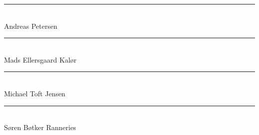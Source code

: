 \thispagestyle{empty}
\vspace*{\fill}
\noindent
\sffamily
%
\rule{9cm}{1pt}\\
\vspace{1.5cm}
Andreas Petersen\\
%
\rule{9cm}{1pt}\\
\vspace{1.5cm}
Mads Ellersgaard Kalør\\
%
\rule{9cm}{1pt}\\
\vspace{1.5cm}
Michael Toft Jensen\\
%
\rule{9cm}{1pt}\\
\vspace{1.5cm}
Søren Bøtker Ranneries\\
%
\normalfont
\vspace*{\fill}